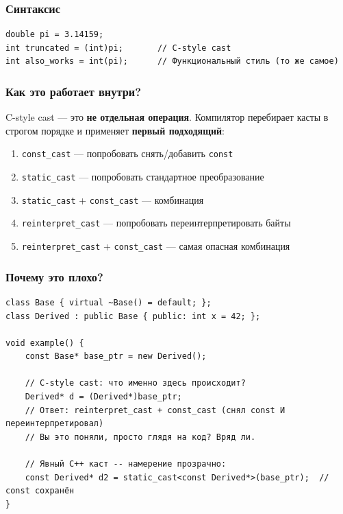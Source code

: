 \documentclass[a4paper,12pt]{article}
\begin{document}
\subsubsection{Синтаксис}

\begin{lstlisting}
double pi = 3.14159;
int truncated = (int)pi;       // C-style cast
int also_works = int(pi);      // Функциональный стиль (то же самое)
\end{lstlisting}

\subsubsection{Как это работает внутри?}

C-style cast --- это \textbf{не отдельная операция}. Компилятор перебирает касты
в строгом порядке и применяет \textbf{первый подходящий}:

\begin{enumerate}
    \item \texttt{const\_cast} --- попробовать снять/добавить \texttt{const}
    \item \texttt{static\_cast} --- попробовать стандартное преобразование
    \item \texttt{static\_cast} + \texttt{const\_cast} --- комбинация
    \item \texttt{reinterpret\_cast} --- попробовать переинтерпретировать байты
    \item \texttt{reinterpret\_cast} + \texttt{const\_cast} --- самая опасная комбинация
\end{enumerate}

\subsubsection{Почему это плохо?}

\begin{lstlisting}
class Base { virtual ~Base() = default; };
class Derived : public Base { public: int x = 42; };

void example() {
    const Base* base_ptr = new Derived();

    // C-style cast: что именно здесь происходит?
    Derived* d = (Derived*)base_ptr;
    // Ответ: reinterpret_cast + const_cast (снял const И переинтерпретировал)
    // Вы это поняли, просто глядя на код? Вряд ли.

    // Явный C++ каст -- намерение прозрачно:
    const Derived* d2 = static_cast<const Derived*>(base_ptr);  // const сохранён
}
\end{lstlisting}
\end{document}
